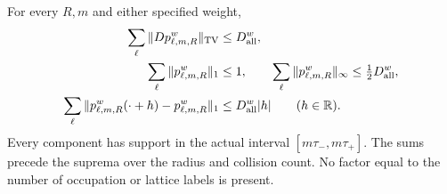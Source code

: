 \begin{theorem}
\label{thm:av-all-bv}
For every $R,m$ and either specified weight,
\begin{align}
 \sum_{\ell}\|Dp^w_{\ell,m,R}\|_{\rm TV}
        &\le D_{\rm all}^w,                              \label{eq:av-all-tv}\\
 \sum_{\ell}\|p^w_{\ell,m,R}\|_1&\le1,\qquad
 \sum_{\ell}\|p^w_{\ell,m,R}\|_\infty
        \le\tfrac12D_{\rm all}^w,                       \label{eq:av-all-height}\\
 \sum_{\ell}\|p^w_{\ell,m,R}(\cdot+h)-p^w_{\ell,m,R}\|_1
        &\le D_{\rm all}^w|h|\qquad(h\in\mathbb R).
                                                               \label{eq:av-all-translation}
\end{align}
Every component has support in the actual interval
$[m\tau_-,m\tau_+]$.  The sums precede the suprema over the radius
and collision count.  No factor equal to the number of occupation or
lattice labels is present.
\end{theorem}
